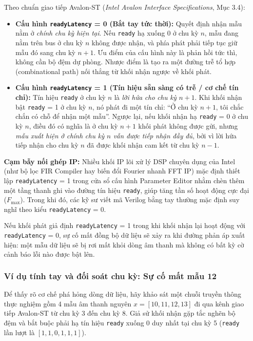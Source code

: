Theo chuẩn giao tiếp Avalon-ST (\emph{Intel Avalon Interface Specifications}, Mục 3.4):
\begin{itemize}[leftmargin=1.5em, itemsep=3pt]
    \item \textbf{Cấu hình \texttt{readyLatency} = 0 (Bắt tay tức thời):} Quyết định nhận mẫu nằm ở \emph{chính chu kỳ hiện tại}. Nếu \texttt{ready} hạ xuống 0 ở chu kỳ $n$, mẫu đang nằm trên bus ở chu kỳ $n$ không được nhận, và phía phát phải tiếp tục giữ mẫu đó sang chu kỳ $n+1$. Ưu điểm của cấu hình này là phản hồi tức thì, không cần bộ đệm dự phòng. Nhược điểm là tạo ra một đường trễ tổ hợp (combinational path) nối thẳng từ khối nhận ngược về khối phát.
    \item \textbf{Cấu hình \texttt{readyLatency} = 1 (Tín hiệu sẵn sàng có trễ / cơ chế tín chỉ):} Tín hiệu \texttt{ready} ở chu kỳ $n$ là \emph{lời hứa cho chu kỳ $n+1$}. Khi khối nhận bật \texttt{ready} = 1 ở chu kỳ $n$, nó phát đi một tín chỉ: ``Ở chu kỳ $n+1$, tôi chắc chắn có chỗ để nhận một mẫu''. Ngược lại, nếu khối nhận hạ \texttt{ready} = 0 ở chu kỳ $n$, điều đó có nghĩa là ở chu kỳ $n+1$ khối phát không được gửi, nhưng \emph{mẫu xuất hiện ở chính chu kỳ $n$ vẫn được tiếp nhận đầy đủ}, bởi vì lời hứa tiếp nhận cho chu kỳ $n$ đã được khối nhận cam kết từ chu kỳ $n-1$.
\end{itemize}

\textbf{Cạm bẫy nối ghép IP:} Nhiều khối IP lõi xử lý DSP chuyên dụng của Intel (như bộ lọc FIR Compiler hay biến đổi Fourier nhanh FFT IP) mặc định thiết lập \texttt{readyLatency} = 1 trong cửa sổ cấu hình Parameter Editor nhằm chèn thêm một tầng thanh ghi vào đường tín hiệu \texttt{ready}, giúp tăng tần số hoạt động cực đại ($F_{\max}$). Trong khi đó, các kỹ sư viết mã Verilog bằng tay thường mặc định suy nghĩ theo kiểu \texttt{readyLatency} = 0.

Nếu khối phát giả định \texttt{readyLatency} = 1 trong khi khối nhận lại hoạt động với \texttt{readyLatency} = 0, sự cố mất đồng bộ dữ liệu sẽ xảy ra khi đường phản áp xuất hiện: một mẫu dữ liệu sẽ bị rơi mất khỏi dòng âm thanh mà không có bất kỳ cờ cảnh báo lỗi nào được bật lên.

\subsubsection*{Ví dụ tính tay và đối soát chu kỳ: Sự cố mất mẫu 12}
Để thấy rõ cơ chế phá hỏng dòng dữ liệu, hãy khảo sát một chuỗi truyền thông thực nghiệm gồm 4 mẫu âm thanh nguyên $x = [10, 11, 12, 13]$ đi qua kênh giao tiếp Avalon-ST từ chu kỳ 3 đến chu kỳ 8. Giả sử khối nhận gặp tắc nghẽn bộ đệm và bắt buộc phải hạ tín hiệu \texttt{ready} xuống 0 duy nhất tại chu kỳ 5 (\texttt{ready} lần lượt là $[1, 1, 0, 1, 1, 1]$).

